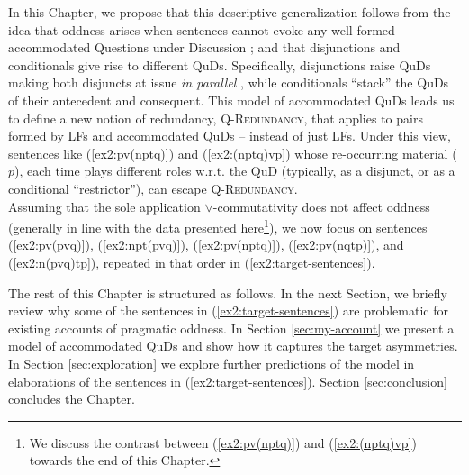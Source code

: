 In this Chapter, we propose that this descriptive generalization follows from the idea that oddness arises when sentences cannot evoke any well-formed accommodated Questions under Discussion \citep{VanKuppevelt1995,Roberts1996}; and that disjunctions and conditionals give rise to different QuDs. Specifically, disjunctions raise QuDs making both disjuncts at issue \textit{in parallel} \cite{Simons2001,Zhang2022}, while conditionals ``stack'' the QuDs of their antecedent and consequent. This model of accommodated QuDs leads us to define a new notion of redundancy, \textsc{Q-Redundancy}, that applies to pairs formed by LFs and accommodated QuDs -- instead of just LFs. Under this view, sentences like (\ref{ex2:pv(nptq)}) and (\ref{ex2:(nptq)vp}) whose re-occurring material ($p$), each time plays different roles w.r.t. the QuD (typically, as a disjunct, or as a conditional ``restrictor''), can escape \textsc{Q-Redundancy}.\\

Assuming that the sole application $\vee$-commutativity does not affect oddness (generally in line with the data presented here\footnote{We discuss the contrast between (\ref{ex2:pv(nptq)}) and (\ref{ex2:(nptq)vp}) towards the end of this Chapter.}), we now focus on sentences (\ref{ex2:pv(pvq)}), (\ref{ex2:npt(pvq)}), (\ref{ex2:pv(nptq)}), (\ref{ex2:pv(nqtp)}), and (\ref{ex2:n(pvq)tp}), repeated in that order in (\ref{ex2:target-sentences}).
\begin{exe}
	\ex \label{ex2:target-sentences}
	\begin{xlist}
		\label{ex2:pv(pvq)-repeated}
		\label{ex2:npt(pvq)-repeated}
		\label{ex2:pv(nptq)-repeated}
		\label{ex2:pv(nqtp)-repeated}
		\label{ex2:n(pvq)tp-repeated}
	\end{xlist}
\end{exe}
The rest of this Chapter is structured as follows. In the next Section, we briefly review why some of the sentences in (\ref{ex2:target-sentences}) are problematic for existing accounts of pragmatic oddness. In Section \ref{sec:my-account} we present a model of accommodated QuDs and show how it captures the target asymmetries. In Section \ref{sec:exploration} we explore further predictions of the model in elaborations of the sentences in (\ref{ex2:target-sentences}). Section \ref{sec:conclusion} concludes the Chapter.


